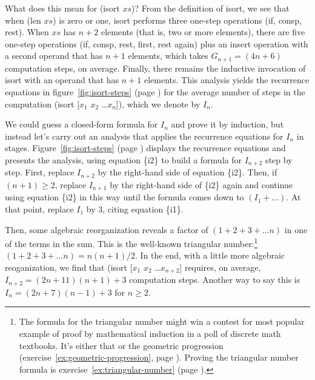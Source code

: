 What does this mean for \textsf{(isort $xs$)}?
From the definition of \textsf{isort},
we see that when \textsf{(len $xs$)} is zero or one,
\textsf{isort} performs three one-step operations
(\textsf{if}, \textsf{consp}, \textsf{rest}).
When $xs$ has $n+2$ elements (that is, two or more elements),
there are five one-step operations
(\textsf{if}, \textsf{consp},
\textsf{rest}, \textsf{first}, \textsf{rest} again)
plus an \textsf{insert} operation
with a second operand that has $n+1$ elements,
which takes $G_{n+1} = (4n+6)$ computation steps, on average.
Finally, there remains the inductive invocation of \textsf{isort}
with an operand that has $n+1$ elements.
This analysis yields the recurrence equations
in figure~\ref{fig:isort-steps} (page \pageref{fig:isort-steps})
for the average number of steps in the computation
\textsf{(isort [$x_1$ $x_2$ \dots $x_{n}$])}, which we denote by $I_n$.

We could guess a closed-form formula for $I_n$ and prove it by induction,
but instead let's carry out an analysis that applies
the recurrence equations for $I_n$ in stages.
Figure~\ref{fig:isort-steps} (page \pageref{fig:isort-steps})
displays the recurrence equations and presents the analysis,
using equation \{i2\} to build a formula for $I_{n+2}$ step by step.
First, replace $I_{n+2}$ by the right-hand side of equation \{i2\}.
Then, if $(n+1)\geq 2$, replace $I_{n+1}$ by the right-hand side of \{i2\} again
and continue using equation \{i2\} in this way until
the formula comes down to $(I_1 + \dots)$.
At that point, replace $I_1$ by $3$, citing equation \{i1\}.

Then, some algebraic reorganization reveals a factor
of $(1 + 2 + 3 + \dots n)$ in one of the terms in the sum.
This is the well-known
triangular number:\footnote{The formula for the triangular number
might win a contest for most popular example of proof by mathematical induction
in a poll of discrete math textbooks. It's either that or the
geometric progression (exercise~\ref{ex:geometric-progression}, page \pageref{ex:geometric-progression}).
Proving the triangular number formula is exercise~\ref{ex:triangular-number} (page \pageref{ex:triangular-number}).}
$(1 + 2 + 3 + \dots n) = n(n+1)/2$.
In the end, with a little more algebraic reoganization,
we find that \textsf{(isort [$x_1$ $x_2$ \dots $x_{n+2}$]} requires,
on average,
$I_{n+2} = (2n+11)(n+1) + 3$ computation steps.
Another way to say this is
$I_{n} = (2n+7)(n-1) + 3$ for $n\geq 2$.

